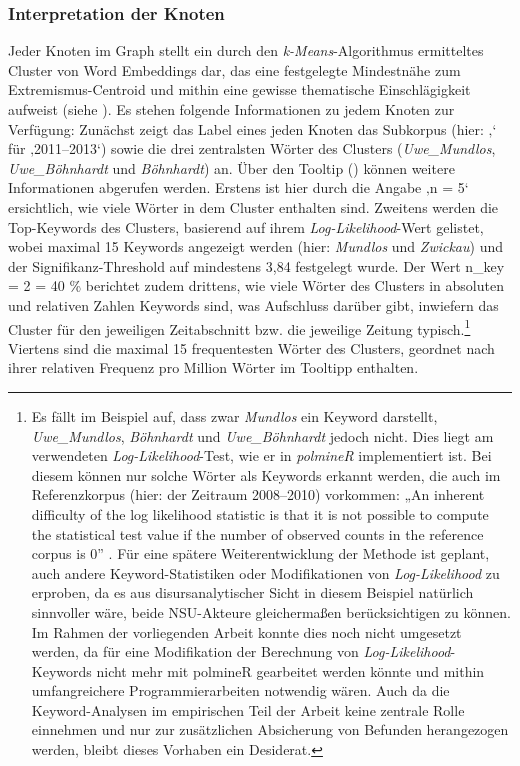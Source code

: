 \subsubsection{Interpretation der Knoten}\label{interpretation-der-knoten}

Jeder Knoten im Graph stellt ein durch den \emph{k-Means}-Algorithmus ermitteltes Cluster von Word Embeddings dar, das eine festgelegte Mindestnähe zum Extremismus-Centroid und mithin eine gewisse thematische Einschlägigkeit aufweist (siehe ). Es stehen folgende Informationen zu jedem Knoten zur Verfügung: Zunächst zeigt das Label eines jeden Knoten das Subkorpus (hier: ‚` für ‚2011--2013`) sowie die drei zentralsten Wörter des Clusters (\emph{Uwe\_Mundlos}, \emph{Uwe\_Böhnhardt} und \emph{Böhnhardt}) an. Über den Tooltip () können weitere Informationen abgerufen werden. Erstens ist hier durch die Angabe ‚n = 5` ersichtlich, wie viele Wörter in dem Cluster enthalten sind. Zweitens werden die Top-Keywords des Clusters, basierend auf ihrem \emph{Log-Likelihood}-Wert gelistet, wobei maximal 15 Keywords angezeigt werden (hier: \emph{Mundlos} und \emph{Zwickau}) und der Signifikanz-Threshold auf mindestens 3,84 festgelegt wurde. Der Wert n\_key = 2 = 40 \% berichtet zudem drittens, wie viele Wörter des Clusters in absoluten und relativen Zahlen Keywords sind, was Aufschluss darüber gibt, inwiefern das Cluster für den jeweiligen Zeitabschnitt bzw. die jeweilige Zeitung typisch.\footnote{Es fällt im Beispiel auf, dass zwar \emph{Mundlos} ein Keyword darstellt, \emph{Uwe\_Mundlos}, \emph{Böhnhardt} und \emph{Uwe\_Böhnhardt} jedoch nicht. Dies liegt am verwendeten \emph{Log-Likelihood}-Test, wie er in \emph{polmineR} implementiert ist. Bei diesem können nur solche Wörter als Keywords erkannt werden, die auch im Referenzkorpus (hier: der Zeitraum 2008--2010) vorkommen: „An inherent difficulty of the log likelihood statistic is that it is not possible to compute the statistical test value if the number of observed counts in the reference corpus is 0'' \autocite{blaetteComputeLoglikelihoodStatistics2020}. Für eine spätere Weiterentwicklung der Methode ist geplant, auch andere Keyword-Statistiken oder Modifikationen von \emph{Log-Likelihood} zu erproben, da es aus disursanalytischer Sicht in diesem Beispiel natürlich sinnvoller wäre, beide NSU-Akteure gleichermaßen berücksichtigen zu können. Im Rahmen der vorliegenden Arbeit konnte dies noch nicht umgesetzt werden, da für eine Modifikation der Berechnung von \emph{Log-Likelihood}-Keywords \autocite[siehe zu entsprechenden Ansätzen][237]{gabrielatosKeynessAnalysisNature2018} nicht mehr mit polmineR gearbeitet werden könnte und mithin umfangreichere Programmierarbeiten notwendig wären. Auch da die Keyword-Analysen im empirischen Teil der Arbeit keine zentrale Rolle einnehmen und nur zur zusätzlichen Absicherung von Befunden herangezogen werden, bleibt dieses Vorhaben ein Desiderat.} Viertens sind die maximal 15 frequentesten Wörter des Clusters, geordnet nach ihrer relativen Frequenz pro Million Wörter im Tooltipp enthalten.

